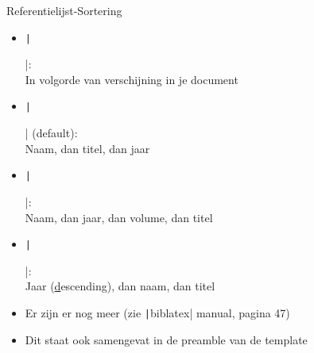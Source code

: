 
\begin{frame}{Referentielijst-Sortering}
	\begin{itemize}[label=\textbullet]
		\item \texttt|\usepackage[sorting=none,...]{biblatex}|: \\
		In volgorde van verschijning in je document

		\item \texttt|\usepackage[sorting=nty,...]{biblatex}| (default):\\
		Naam, dan titel, dan jaar

		\item \texttt|\usepackage[sorting=nyvt,...]{biblatex}|:\\
		Naam, dan jaar, dan volume, dan titel

		\item \texttt|\usepackage[sorting=ydnt,...]{biblatex}|:\\
		Jaar (\underline{d}escending), dan naam, dan titel

		\item Er zijn er nog meer (zie \texttt|biblatex| manual, pagina 47)
		
		\item Dit staat ook samengevat in de preamble van de template
	\end{itemize}
\end{frame}

